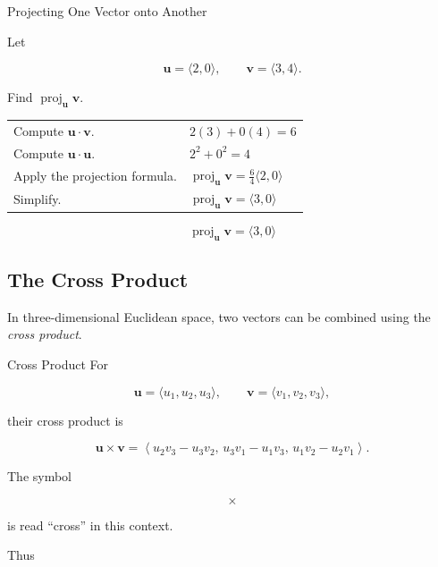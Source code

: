 \begin{workedexamplebox}{Projecting One Vector onto Another}

Let

\[ \mathbf{u}=\langle2,0\rangle,\qquad
\mathbf{v}=\langle3,4\rangle. \]

Find \(\operatorname{proj}_{\mathbf{u}}\mathbf{v}\).

\begin{tabularx}{\textwidth}{@{}>{\raggedright\arraybackslash}p{}X@{}}
Compute \(\mathbf{u}\cdot\mathbf{v}\). &
\(2(3)+0(4)=6\)\\
Compute \(\mathbf{u}\cdot\mathbf{u}\). &
\(2^2+0^2=4\)\\
Apply the projection formula. &
\(\operatorname{proj}_{\mathbf{u}}\mathbf{v}
=\frac64\langle2,0\rangle\)\\
Simplify. &
\(\operatorname{proj}_{\mathbf{u}}\mathbf{v}=\langle3,0\rangle\)
\end{tabularx}

\begin{answerbox}
\[ \boxed{\operatorname{proj}_{\mathbf{u}}\mathbf{v}=\langle3,0\rangle} \]
\end{answerbox}
\end{workedexamplebox}

\subsection{The Cross Product}
\label{subsec:cross-product-vector-geometry}

In three-dimensional Euclidean space, two vectors can be combined using the
\emph{cross product}.

\begin{definitionbox}{Cross Product}
For

\[
\mathbf{u}=\langle u_1,u_2,u_3\rangle,\qquad
\mathbf{v}=\langle v_1,v_2,v_3\rangle,
\]

their cross product is

\[
\boxed{
\mathbf{u}\times\mathbf{v}
=
\left\langle
u_2v_3-u_3v_2,\,
u_3v_1-u_1v_3,\,
u_1v_2-u_2v_1
\right\rangle.
}
\]
\end{definitionbox}

The symbol

\[ \times \]

is read ``cross'' in this context.

Thus

